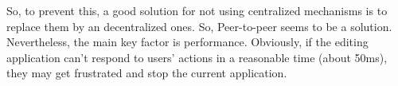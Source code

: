 So, to prevent this, a good solution for not using centralized mechanisms is to replace them by an decentralized ones. So, Peer-to-peer seems to be a solution. Nevertheless, the main key factor is performance. Obviously, if the editing application can't respond to users' actions in a reasonable time (about 50ms), they may get frustrated and stop the current application.